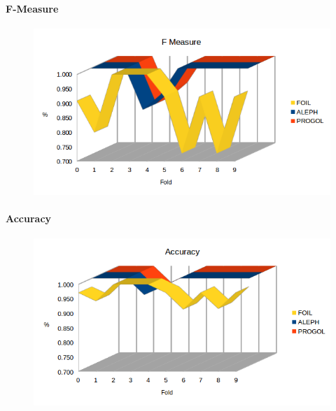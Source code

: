 \paragraph{F-Measure}
\begin{figure}[H]
	\includegraphics[width=1.1\textwidth]{img/datasetGraph/elsevier/fm.png}
	\label{Elsevier-F-measure}
\end{figure}

\paragraph{Accuracy}
\begin{figure}[H]
\includegraphics[width=1.1\textwidth]{img/datasetGraph/elsevier/accuracy.png}
\label{Elsevier-Accuracy}
\end{figure}

